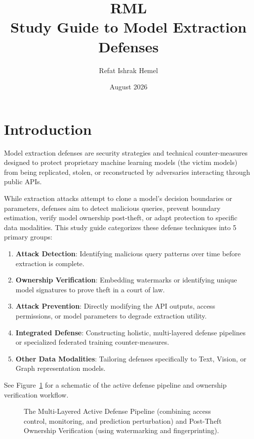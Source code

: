 \documentclass{article}
\title{RML\\
\large Study Guide to Model Extraction Defenses}
\author{Refat Ishrak Hemel}
\date{August 2026}
\begin{document}
\maketitle

\section{Introduction}
Model extraction defenses are security strategies and technical counter-measures designed to protect proprietary machine learning models (the victim models) from being replicated, stolen, or reconstructed by adversaries interacting through public APIs. 

While extraction attacks attempt to clone a model's decision boundaries or parameters, defenses aim to detect malicious queries, prevent boundary estimation, verify model ownership post-theft, or adapt protection to specific data modalities. This study guide categorizes these defense techniques into 5 primary groups:
\begin{enumerate}
    \item \textbf{Attack Detection}: Identifying malicious query patterns over time before extraction is complete.
    \item \textbf{Ownership Verification}: Embedding watermarks or identifying unique model signatures to prove theft in a court of law.
    \item \textbf{Attack Prevention}: Directly modifying the API outputs, access permissions, or model parameters to degrade extraction utility.
    \item \textbf{Integrated Defense}: Constructing holistic, multi-layered defense pipelines or specialized federated training counter-measures.
    \item \textbf{Other Data Modalities}: Tailoring defenses specifically to Text, Vision, or Graph representation models.
\end{enumerate}

See Figure~\ref{fig:defense_pipeline} for a schematic of the active defense pipeline and ownership verification workflow.

\begin{figure}[htbp]
    \centering
    \caption{The Multi-Layered Active Defense Pipeline (combining access control, monitoring, and prediction perturbation) and Post-Theft Ownership Verification (using watermarking and fingerprinting).}
    \label{fig:defense_pipeline}
\end{figure}
\end{document}
